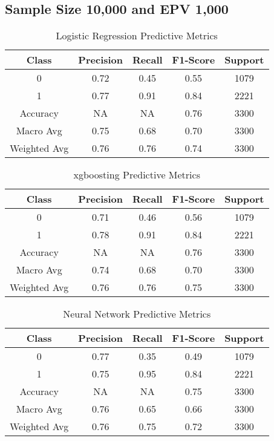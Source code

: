 \documentclass[
  man]{apa7}
\begin{document}
\hypertarget{sample-size-10000-and-epv-1000}{%
\subsection{Sample Size 10,000 and EPV 1,000}\label{sample-size-10000-and-epv-1000}}

\begin{table}
\centering
\caption{\label{tab:logitable10k}Logistic Regression Predictive Metrics}
\centering
\fontsize{12}{14}\selectfont
\begin{tabular}[t]{c|c|c|c|c}
\hline
Class & Precision & Recall & F1-Score & Support\\
\hline
0 & 0.72 & 0.45 & 0.55 & 1079\\
\hline
1 & 0.77 & 0.91 & 0.84 & 2221\\
\hline
Accuracy & NA & NA & 0.76 & 3300\\
\hline
Macro Avg & 0.75 & 0.68 & 0.70 & 3300\\
\hline
Weighted Avg & 0.76 & 0.76 & 0.74 & 3300\\
\hline
\end{tabular}
\end{table}

\begin{table}
\centering
\caption{\label{tab:xgbtable10k}xgboosting Predictive Metrics}
\centering
\fontsize{12}{14}\selectfont
\begin{tabular}[t]{c|c|c|c|c}
\hline
Class & Precision & Recall & F1-Score & Support\\
\hline
0 & 0.71 & 0.46 & 0.56 & 1079\\
\hline
1 & 0.78 & 0.91 & 0.84 & 2221\\
\hline
Accuracy & NA & NA & 0.76 & 3300\\
\hline
Macro Avg & 0.74 & 0.68 & 0.70 & 3300\\
\hline
Weighted Avg & 0.76 & 0.76 & 0.75 & 3300\\
\hline
\end{tabular}
\end{table}

\begin{table}
\centering
\caption{\label{tab:nn10k}Neural Network Predictive Metrics}
\centering
\fontsize{12}{14}\selectfont
\begin{tabular}[t]{c|c|c|c|c}
\hline
Class & Precision & Recall & F1-Score & Support\\
\hline
0 & 0.77 & 0.35 & 0.49 & 1079\\
\hline
1 & 0.75 & 0.95 & 0.84 & 2221\\
\hline
Accuracy & NA & NA & 0.75 & 3300\\
\hline
Macro Avg & 0.76 & 0.65 & 0.66 & 3300\\
\hline
Weighted Avg & 0.76 & 0.75 & 0.72 & 3300\\
\hline
\end{tabular}
\end{table}
\end{document}
